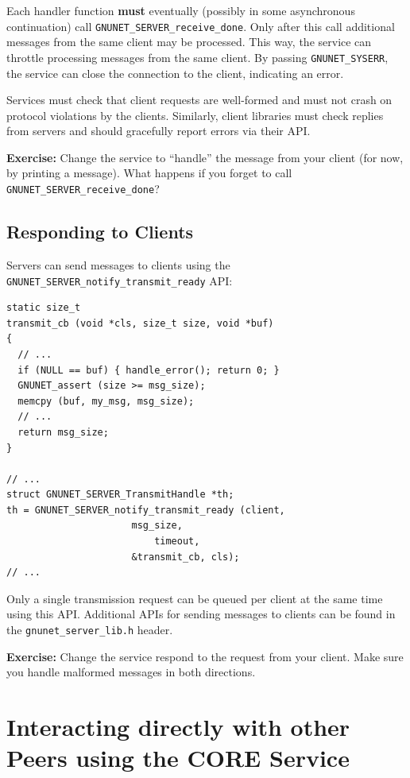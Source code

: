 \documentclass[10pt]{article}
\newcommand{\exercise}[1]{\noindent\begin{boxedminipage}{\textwidth}{\bf Exercise:} #1 \end{boxedminipage}}
\begin{document}
Each handler function {\bf must} eventually (possibly in some
asynchronous continuation) call {\tt GNUNET\_SERVER\_receive\_done}.
Only after this call additional messages from the same client may
be processed. This way, the service can throttle processing messages
from the same client.  By passing {\tt GNUNET\_SYSERR}, the service
can close the connection to the client, indicating an error.

Services must check that client requests are well-formed and must not
crash on protocol violations by the clients.  Similarly, client
libraries must check replies from servers and should gracefully report
errors via their API.


\exercise{Change the service to ``handle'' the message from your
client (for now, by printing a message).  What happens if you
forget to call {\tt GNUNET\_SERVER\_receive\_done}?}


\subsection{Responding to Clients}

Servers can send messages to clients using the
{\tt GNUNET\_SERVER\_notify\_transmit\_ready} API:

\lstset{language=c}
\begin{lstlisting}
static size_t
transmit_cb (void *cls, size_t size, void *buf)
{
  // ...
  if (NULL == buf) { handle_error(); return 0; }
  GNUNET_assert (size >= msg_size);
  memcpy (buf, my_msg, msg_size);
  // ...
  return msg_size;
}

// ...	
struct GNUNET_SERVER_TransmitHandle *th;
th = GNUNET_SERVER_notify_transmit_ready (client,
					  msg_size,
 				          timeout,
					  &transmit_cb, cls);
// ...
\end{lstlisting}

Only a single transmission request can be queued per client
at the same time using this API.
Additional APIs for sending messages to clients can be found
in the {\tt gnunet\_server\_lib.h} header.  


\exercise{Change the service respond to the request from your
client.  Make sure you handle malformed messages in both directions.}


\section{Interacting directly with other Peers using the CORE Service}
\end{document}
